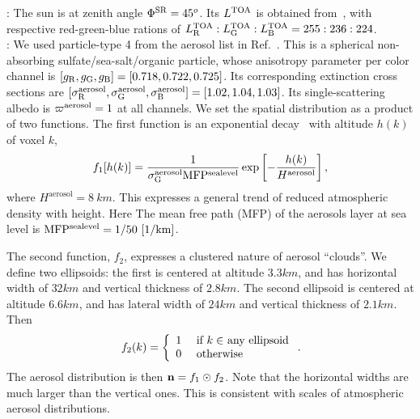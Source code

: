 \documentclass[10pt,twocolumn,letterpaper]{article}
\begin{document}
: The sun is at zenith angle $\Phi^{\rm SR}=45^o$. Its
$L^{\rm TOA}$ is obtained from~\cite{sun_composition,BBradiance}, with respective red-green-blue rations of
 $L^{\rm TOA}_{\rm R}:L^{\rm TOA}_{\rm G}:L^{\rm TOA}_{\rm B}=255:236:224$.\\

: We used particle-type 4 from the aerosol list in
Ref.~\cite{Martonchik2009}. This is a spherical non-absorbing sulfate/sea-salt/organic particle, whose anisotropy parameter per color channel is $[g_{\rm R},g_{\rm G},g_{\rm B}]=[0.718,0.722,0.725]$. Its corresponding extinction cross sections are
  $[\sigma^{\rm aerosol}_{\rm R},
    \sigma^{\rm aerosol}_{\rm G},
    \sigma^{\rm aerosol}_{\rm B}]=[1.02,1.04,1.03]$.
Its single-scattering albedo is $\varpi^{\rm aerosol}=1$ at all channels.
We set the spatial distribution as a product of two functions. The first function is an exponential decay~\cite{Levi1980} with altitude $h(k)$ of voxel $k$,
\begin{align}
 f_1[h(k)] = \frac{1}
 {\sigma^{\rm aerosol}_{\rm G} \mathrm{MFP^{sea level}}}
  \exp\left[-\frac{h(k)}{H^\mathrm{aerosol}}\right],
\end{align}
where $H^\mathrm{aerosol}=8\ km$. This expresses a general trend of reduced atmospheric density with height. Here
The mean free path (MFP) of the aerosols layer at sea level is
$\mathrm{MFP^{sea level}}=1/50~{\rm[1/km]}$.

The second function, $f_2$, expresses a clustered nature of aerosol ``clouds''. We define two ellipsoids: the first is centered at altitude
$3.3km$, and has horizontal width of $32km$ and vertical thickness of $2.8km$. The second ellipsoid is centered at altitude $6.6km$, and has lateral width of $24km$ and vertical thickness of $2.1km$. Then
\begin{equation}
  f_2(k) = 
  \left\{
      \begin{array}{ll}
          1  & \mbox{ if $k\in$ any ellipsoid} \\
          0  & \mbox{ otherwise}
    \label{eq:f2}
       \end{array} 
  \right. 
  .
  \hspace{-0.05cm}
\end{equation}
The aerosol distribution is then ${\bf n}=f_1\odot f_2$.
Note that the horizontal widths are much larger than the vertical ones. This is consistent with scales of atmospheric aerosol distributions.\\
\end{document}
